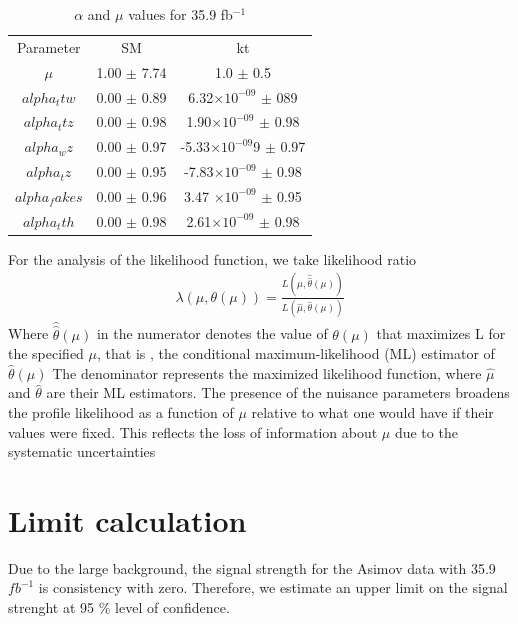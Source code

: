\begin{table}[ht]
	\centering
	\caption{$\alpha$ and $\mu$ values for 35.9 fb$^{-1}$}
	\begin{tabular}{ccc}
		\hline
		Parameter  & SM &kt\\
		$\mu$   & 1.00 $\pm$  7.74& 1.0 $\pm$  0.5\\
		$alpha_ttw$&  0.00 $\pm$  0.89&  6.32$\times 10^{-09}$ $\pm$  089\\
		$alpha_ttz$ &  0.00 $\pm$  0.98& 1.90$\times 10^{-09}$ $\pm$  0.98\\
		$alpha_wz$   & 0.00 $\pm$  0.97& -5.33$\times 10^{-09}$9 $\pm$  0.97\\
		$alpha_tz$   &0.00 $\pm$  0.95&-7.83$\times 10^{-09}$ $\pm$  0.98 \\
		$alpha_fakes$ &   0.00 $\pm$  0.96&  3.47 $\times 10^{-09}$ $\pm$  0.95\\
		$alpha_tth$ &0.00 $\pm$  0.98& 2.61$\times 10^{-09}$ $\pm$ 0.98\\
	\end{tabular}
\label{parameters}
\end{table}

For the analysis of the likelihood function,  we take likelihood ratio
\begin{align}
	\lambda(\mu,\theta(\mu))=\frac{L(\mu,\hat{\hat{\theta}}(\mu))}{L(\hat{\mu},\hat{\theta}(\mu))}
\end{align}
Where $\hat{\hat{\theta}}(\mu) $ in the numerator denotes the value of $\theta(\mu)$ that maximizes L for the specified $\mu$, that is , the conditional maximum-likelihood (ML) estimator of $\hat{\theta}(\mu)$ 
The denominator represents the  maximized  likelihood function, where $\hat{\mu}$ and $\hat{\theta}$ are
their ML estimators.
The presence of the nuisance parameters broadens the profile likelihood as a
function of $\mu$ relative to what one would have if their values were fixed. This reflects the loss
of information about $\mu$ due to the systematic uncertainties

\section{Limit calculation}
Due to the large background, the signal strength for the Asimov data with 35.9 $fb^{-1}$ is consistency with zero.
Therefore, we estimate an upper limit on the signal strenght at 95 $\%$ level of confidence.








